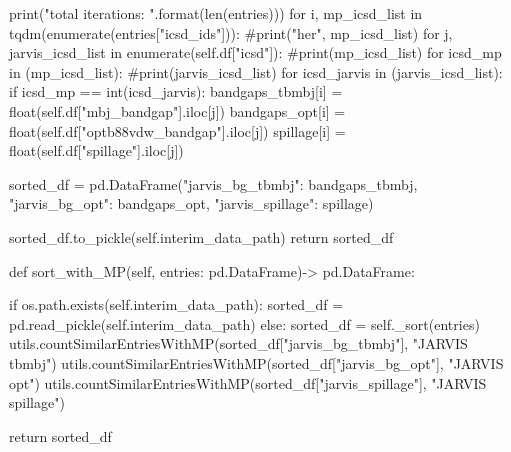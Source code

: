         print("total iterations: {}".format(len(entries)))
        for i, mp_icsd_list in tqdm(enumerate(entries["icsd_ids"])):
            #print("her", mp_icsd_list)
            for j, jarvis_icsd_list in enumerate(self.df["icsd"]):
                #print(mp_icsd_list)
                for icsd_mp in (mp_icsd_list):
                    #print(jarvis_icsd_list)
                    for icsd_jarvis in (jarvis_icsd_list):
                        if icsd_mp == int(icsd_jarvis):
                            bandgaps_tbmbj[i] = float(self.df["mbj_bandgap"].iloc[j])
                            bandgaps_opt[i]   = float(self.df["optb88vdw_bandgap"].iloc[j])
                            spillage[i]      = float(self.df["spillage"].iloc[j])

        sorted_df = pd.DataFrame({"jarvis_bg_tbmbj": bandgaps_tbmbj,
                                  "jarvis_bg_opt":   bandgaps_opt,
                                  "jarvis_spillage": spillage})

        sorted_df.to_pickle(self.interim_data_path)
        return sorted_df

    def sort_with_MP(self, entries: pd.DataFrame)-> pd.DataFrame:

        if os.path.exists(self.interim_data_path):
            sorted_df = pd.read_pickle(self.interim_data_path)
        else:
            sorted_df = self._sort(entries)
        utils.countSimilarEntriesWithMP(sorted_df["jarvis_bg_tbmbj"], "JARVIS tbmbj")
        utils.countSimilarEntriesWithMP(sorted_df["jarvis_bg_opt"],   "JARVIS opt")
        utils.countSimilarEntriesWithMP(sorted_df["jarvis_spillage"], "JARVIS spillage")

        return sorted_df
